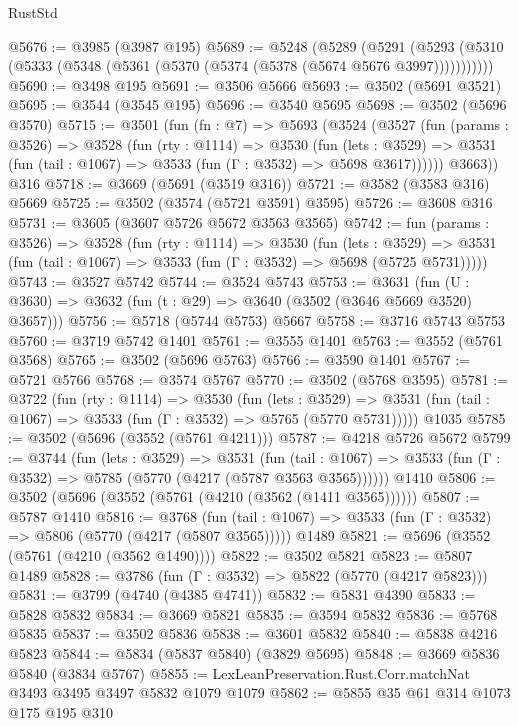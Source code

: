 \begin{lexlean}{RustStd}
\begin{coremodule}
@5676 := @3985 (@3987 @195)
@5689 := @5248
    (@5289
      (@5291 (@5293 (@5310 (@5333 (@5348 (@5361 (@5370 (@5374 (@5378 (@5674 @5676 @3997)))))))))))
@5690 := @3498 @195
@5691 := @3506 @5666
@5693 := @3502 (@5691 @3521)
@5695 := @3544 (@3545 @195)
@5696 := @3540 @5695
@5698 := @3502 (@5696 @3570)
@5715 := @3501
    (fun (fn : @7) =>
    @5693
      (@3524
        (@3527
          (fun (params : @3526) =>
          @3528
            (fun (rty : @1114) =>
            @3530
              (fun (lets : @3529) =>
              @3531 (fun (tail : @1067) => @3533 (fun (Γ : @3532) => @5698 @3617))))))
        @3663))
    @316
@5718 := @3669 (@5691 (@3519 @316))
@5721 := @3582 (@3583 @316) @5669
@5725 := @3502 (@3574 (@5721 @3591) @3595)
@5726 := @3608 @316
@5731 := @3605 (@3607 @5726 @5672 @3563 @3565)
@5742 := fun (params : @3526) =>
  @3528
    (fun (rty : @1114) =>
    @3530
      (fun (lets : @3529) =>
      @3531 (fun (tail : @1067) => @3533 (fun (Γ : @3532) => @5698 (@5725 @5731)))))
@5743 := @3527 @5742
@5744 := @3524 @5743
@5753 := @3631 (fun (U : @3630) => @3632 (fun (t : @29) => @3640 (@3502 (@3646 @5669 @3520) @3657)))
@5756 := @5718 (@5744 @5753) @5667
@5758 := @3716 @5743 @5753
@5760 := @3719 @5742 @1401
@5761 := @3555 @1401
@5763 := @3552 (@5761 @3568)
@5765 := @3502 (@5696 @5763)
@5766 := @3590 @1401
@5767 := @5721 @5766
@5768 := @3574 @5767
@5770 := @3502 (@5768 @3595)
@5781 := @3722
    (fun (rty : @1114) =>
    @3530
      (fun (lets : @3529) =>
      @3531 (fun (tail : @1067) => @3533 (fun (Γ : @3532) => @5765 (@5770 @5731)))))
    @1035
@5785 := @3502 (@5696 (@3552 (@5761 @4211)))
@5787 := @4218 @5726 @5672
@5799 := @3744
    (fun (lets : @3529) =>
    @3531
      (fun (tail : @1067) => @3533 (fun (Γ : @3532) => @5785 (@5770 (@4217 (@5787 @3563 @3565))))))
    @1410
@5806 := @3502 (@5696 (@3552 (@5761 (@4210 (@3562 (@1411 @3565))))))
@5807 := @5787 @1410
@5816 := @3768
    (fun (tail : @1067) => @3533 (fun (Γ : @3532) => @5806 (@5770 (@4217 (@5807 @3565)))))
    @1489
@5821 := @5696 (@3552 (@5761 (@4210 (@3562 @1490))))
@5822 := @3502 @5821
@5823 := @5807 @1489
@5828 := @3786 (fun (Γ : @3532) => @5822 (@5770 (@4217 @5823)))
@5831 := @3799 (@4740 (@4385 @4741))
@5832 := @5831 @4390
@5833 := @5828 @5832
@5834 := @3669 @5821
@5835 := @3594 @5832
@5836 := @5768 @5835
@5837 := @3502 @5836
@5838 := @3601 @5832
@5840 := @5838 @4216 @5823
@5844 := @5834 (@5837 @5840) (@3829 @5695)
@5848 := @3669 @5836 @5840 (@3834 @5767)
@5855 := LexLeanPreservation.Rust.Corr.matchNat @3493 @3495 @3497 @5832 @1079 @1079
@5862 := @5855 @35 @61 @314 @1073 @175 @195 @310

\end{coremodule}
\end{lexlean}
